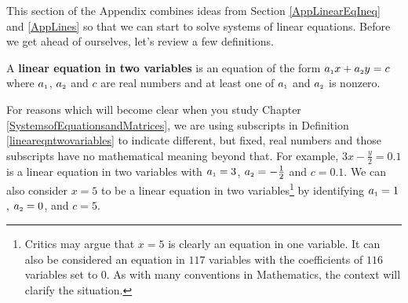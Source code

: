 \documentclass{ximera}
\begin{document}
	\author{Stitz-Zeager}




\setcounter{footnote}{0}

\label{AppLinearSystems}

\setlength{\extrarowheight}{0pt}

This section of the Appendix combines ideas from Section \ref{AppLinearEqIneq} and \ref{AppLines} so that we can start to solve systems of linear equations.  Before we get ahead of ourselves, let's review a few definitions.

\medskip


\begin{definition}  \label{lineareqntwovariables}  A \textbf{linear equation in two variables} is an equation of the form $a_{\mbox{\tiny$1$}} x + a_{\mbox{\tiny$2$}} y = c$ where $a_{\mbox{\tiny$1$}}$, $a_{\mbox{\tiny$2$}}$ and $c$ are real numbers and at least one of $a_{\mbox{\tiny$1$}}$ and $a_{\mbox{\tiny$2$}}$ is nonzero.

\end{definition}


\medskip

For reasons which will become clear when you study Chapter \ref{SystemsofEquationsandMatrices}, we are using subscripts in Definition \ref{lineareqntwovariables} to indicate different, but fixed, real numbers and those subscripts have no mathematical meaning beyond that.  For example, $3x - \frac{y}{2} = 0.1$ is a linear equation in two variables with $a_{\mbox{\tiny$1$}} = 3$, $a_{\mbox{\tiny$2$}} = -\frac{1}{2}$ and $c = 0.1$.  We can also consider $x = 5$ to be a linear equation in two variables\footnote{Critics may argue that $x=5$ is clearly an equation in one variable.  It can also be considered an equation in $117$ variables with the coefficients of $116$ variables set to $0$.  As with many conventions in Mathematics, the context will clarify the situation.} by identifying $a_{\mbox{\tiny$1$}} = 1$, $a_{\mbox{\tiny$2$}} = 0$, and $c = 5$.  

\medskip
\end{document}
